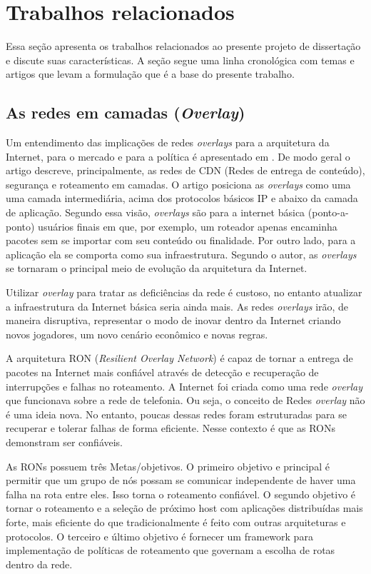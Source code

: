 \chapter{Trabalhos relacionados}

Essa seção apresenta os trabalhos relacionados ao presente projeto de
dissertação e discute suas características.
A seção segue uma linha cronológica com temas e artigos que levam a
formulação que é a base do presente trabalho.

\section{As redes em camadas (\emph{Overlay})}

Um entendimento das implicações de redes \emph{overlays} para a
arquitetura da Internet, para o mercado e para a política
é apresentado em \citep{clark2006overlay}.
De modo geral o artigo descreve, principalmente, as redes de
CDN (Redes de entrega de conteúdo), segurança e roteamento em camadas.
O artigo posiciona as \emph{overlays} como uma uma camada intermediária,
acima dos protocolos básicos IP e abaixo da camada de
aplicação.
Segundo essa visão, \emph{overlays} são para a internet básica (ponto-a-ponto)
usuários finais em que, por exemplo, um roteador apenas encaminha pacotes sem
se importar com seu conteúdo ou finalidade.
Por outro lado, para a aplicação ela se comporta como sua infraestrutura.
Segundo o autor, as \emph{overlays} se tornaram o principal meio de
evolução da arquitetura da Internet.

Utilizar \emph{overlay} para tratar as deficiências da rede é custoso, no
entanto atualizar a infraestrutura da Internet básica seria ainda mais.
As redes \emph{overlays} irão, de maneira disruptiva, representar o modo de
inovar dentro da Internet criando novos jogadores,
um novo cenário econômico e novas regras.

A arquitetura RON (\emph{Resilient Overlay Network})
\citep{anderson2001resilient} é capaz de tornar a entrega de pacotes na
Internet mais confiável através de detecção e recuperação de interrupções e
falhas no roteamento.
A Internet foi criada como uma rede \emph{overlay} que funcionava sobre a rede
de telefonia. Ou seja, o conceito de Redes \emph{overlay} não é uma ideia nova.
No entanto, poucas dessas redes foram estruturadas para se recuperar e tolerar
falhas de forma eficiente. Nesse contexto é que as RONs demonstram ser
confiáveis.

As RONs possuem três Metas/objetivos. O primeiro objetivo e principal é
permitir que um grupo de nós possam se comunicar independente de haver uma
falha na rota entre eles.
Isso torna o roteamento confiável. O segundo objetivo
é tornar o roteamento e a seleção de próximo host com aplicações distribuídas
mais forte, mais eficiente do que tradicionalmente é feito com outras
arquiteturas e protocolos.
O terceiro e último objetivo é fornecer um framework
para implementação de políticas de roteamento que governam a escolha de rotas
dentro da rede.


